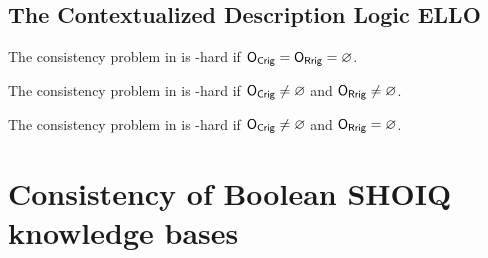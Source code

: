 \subsection{The Contextualized Description Logic ELLO}
\label{sec:con-dl-el-lo}

\begin{theorem}
  The consistency problem in \condl{\EL}{\ALC} is \ExpTime-hard if $\mathsf{O_{Crig}} = \mathsf{O_{Rrig}} = \varnothing$.
\end{theorem}
\missingproof

\begin{theorem}
  The consistency problem in \condl{\EL}{\ALC} is \TwoExpTime-hard if $\mathsf{O_{Crig}} \neq \varnothing$ and
  $\mathsf{O_{Rrig}} \neq \varnothing$.
\end{theorem}
\missingproof

\begin{theorem}
  The consistency problem in \condl{\EL}{\ALC} is \NExpTime-hard if $\mathsf{O_{Crig}} \neq \varnothing$ and
  $\mathsf{O_{Rrig}} = \varnothing$.
\end{theorem}
\missingproof


\section{Consistency of Boolean SHOIQ knowledge bases}
\label{sec:consistency-shoiq-bkb}





